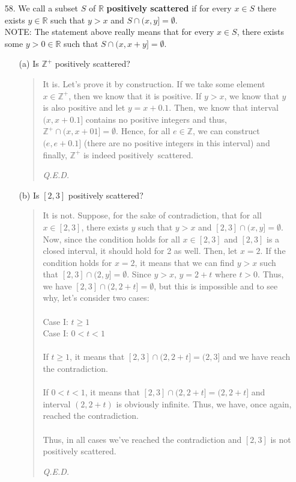 \documentclass[12pt, a4paper]{article}                      %
\begin{document}
\begin{itemize}
\item[]
\item[]

\item[58.]
We call a subset $S$ of $\mathbb{R}$ \textbf{positively scattered} if for every $x \in S$
there exists $y \in \mathbb{R}$ such that $y > x$ and $S \cap (x,y] = \emptyset$.\\

NOTE: The statement above really means that for every $x \in S$, there exists some $y > 0 \in \mathbb{R}$ such that $S \cap (x, x + y] = \emptyset.$
\\
\begin{itemize}
\item[(a)]
Is $\mathbb{Z}^+$ positively scattered? 
\begin{quote}
It is. Let's prove it by construction. If we take some element $x \in \mathbb{Z}^+$, then we know that it is positive.
If $y > x$, we know that $y$ is also positive and let $y = x + 0.1$. Then, we know that interval $(x, x + 0.1]$
contains no positive integers and thus, $\mathbb{Z}^+ \cap (x, x + 01] = \emptyset$. Hence, for all $e \in \mathbb{Z}$, we can
construct $(e, e+0.1]$ (there are no positive integers in this interval) and finally, $\mathbb{Z}^+$ is indeed positively\
scattered.
\begin{flushright}
\textit{Q.E.D.}
\end{flushright}
\end{quote}

\item[]

\item[(b)]
Is $[2, 3]$ positively scattered? 
\begin{quote}
It is not. Suppose, for the sake of contradiction, that for all $x \in [2, 3]$, there
exists $y$ such that $y > x$ and $[2, 3] \cap (x, y] = \emptyset$. Now, since the condition
holds for all $x \in [2, 3]$ and $[2, 3]$ is a closed interval, it should hold for 2 as well.
Then, let $x = 2$. If the condition holds for $x = 2$, it means that we can find $y > x$ such
that $[2, 3] \cap (2, y] = \emptyset$. Since $y > x$, $y = 2 + t$ where $t > 0$. Thus,
we have $[2, 3] \cap (2, 2 + t] = \emptyset$, but this is impossible and to see why, let's
consider two cases:\\\\
Case I: $t \geq 1$\\
Case I: $0 < t <  1$\\\\
If $t \geq 1$, it means that $[2, 3] \cap (2, 2 + t] = (2, 3]$ and we have reach the contradiction.\\\\
If $0 < t < 1$, it means that $[2, 3] \cap (2, 2 + t] = (2, 2 + t]$ and interval $(2, 2 + t)$ is obviously infinite. Thus, we have, once again, reached the contradiction.\\\\
Thus, in all cases we've reached the contradiction and $[2, 3]$ is not positively scattered.
\begin{flushright}
\textit{Q.E.D.}
\end{flushright}
\end{quote}


\end{itemize}
\end{itemize}
\end{document}
